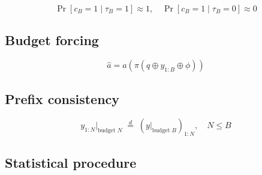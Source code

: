 \documentclass[conference]{IEEEtran}
\newif\ifdraft
\newcommand{\writehere}[2]{%
  \ifdraft
    {\color{orange!75!black}\small\textbf{[WRITE: #1]}\itshape\ #2\par}
    \medskip
  \fi}
\begin{document}
\begin{equation}
\Pr[c_B = 1 \mid \tau_B = 1] \approx 1, \quad
\Pr[c_B = 1 \mid \tau_B = 0] \approx 0
\label{eq:hyp}
\end{equation}

\subsection{Budget forcing}

\writehere{1 paragraph}{
Describe the procedure before the equation. Forcing acts only on truncated
samples: take the truncated prefix, append a fixed phrase that closes the
reasoning block and asks for the answer, decode greedily for a short continuation.
Samples that terminated on their own are left untouched, and say explicitly that
this is why the method cannot damage them. The cost is about five generated tokens
per intervened sample.}

\begin{equation}
\hat{a} = a\!\left(\pi\!\left(q \oplus y_{1:B} \oplus \phi\right)\right)
\label{eq:forcing}
\end{equation}

\writehere{2 sentences on the three variants}{
Name them: a bare demand $V_1$, a soft deadline $V_3$, and a two stage variant
$V_2$ where the model first summarises what it established and only then is asked
for the answer. Say why three rather than one.}

\subsection{Prefix consistency}

\writehere{1 paragraph}{
Explain (\ref{eq:prefix}) in plain words: the model generates left to right and
has no knowledge of its own budget, so the distribution of the first N tokens does
not depend on where generation was stopped. The consequence is that saving traces
at the top budget lets every smaller budget be scored on CPU at no GPU cost.
Validated in Section IV rather than assumed.}

\begin{equation}
y_{1:N} \Big|_{\text{budget } N}
\;\overset{d}{=}\;
\left(y \Big|_{\text{budget } B}\right)_{1:N},
\quad N \le B
\label{eq:prefix}
\end{equation}

\subsection{Statistical procedure}
\end{document}

